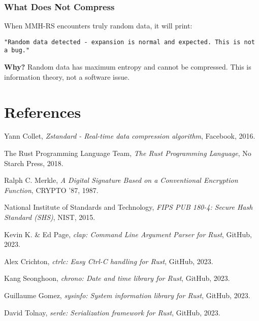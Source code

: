 \documentclass[11pt,a4paper]{article}
\begin{document}
	\subsubsection{What Does Not Compress}
	When MMH-RS encounters truly random data, it will print:
	\begin{lstlisting}[basicstyle=\ttfamily\small]
	"Random data detected - expansion is normal and expected. This is not a bug."
	\end{lstlisting}

	\textbf{Why?} Random data has maximum entropy and cannot be compressed. This is information theory, not a software issue.

	\section{References}
	\label{sec:references}

	\begin{thebibliography}{9}

	Yann Collet,
	\textit{Zstandard - Real-time data compression algorithm},
	Facebook, 2016.

	The Rust Programming Language Team,
	\textit{The Rust Programming Language},
	No Starch Press, 2018.

	Ralph C. Merkle,
	\textit{A Digital Signature Based on a Conventional Encryption Function},
	CRYPTO '87, 1987.

	National Institute of Standards and Technology,
	\textit{FIPS PUB 180-4: Secure Hash Standard (SHS)},
	NIST, 2015.

	Kevin K. \& Ed Page,
	\textit{clap: Command Line Argument Parser for Rust},
	GitHub, 2023.

	Alex Crichton,
	\textit{ctrlc: Easy Ctrl-C handling for Rust},
	GitHub, 2023.

	Kang Seonghoon,
	\textit{chrono: Date and time library for Rust},
	GitHub, 2023.

	Guillaume Gomez,
	\textit{sysinfo: System information library for Rust},
	GitHub, 2023.

	David Tolnay,
	\textit{serde: Serialization framework for Rust},
	GitHub, 2023.

	\end{thebibliography}

\end{document}
